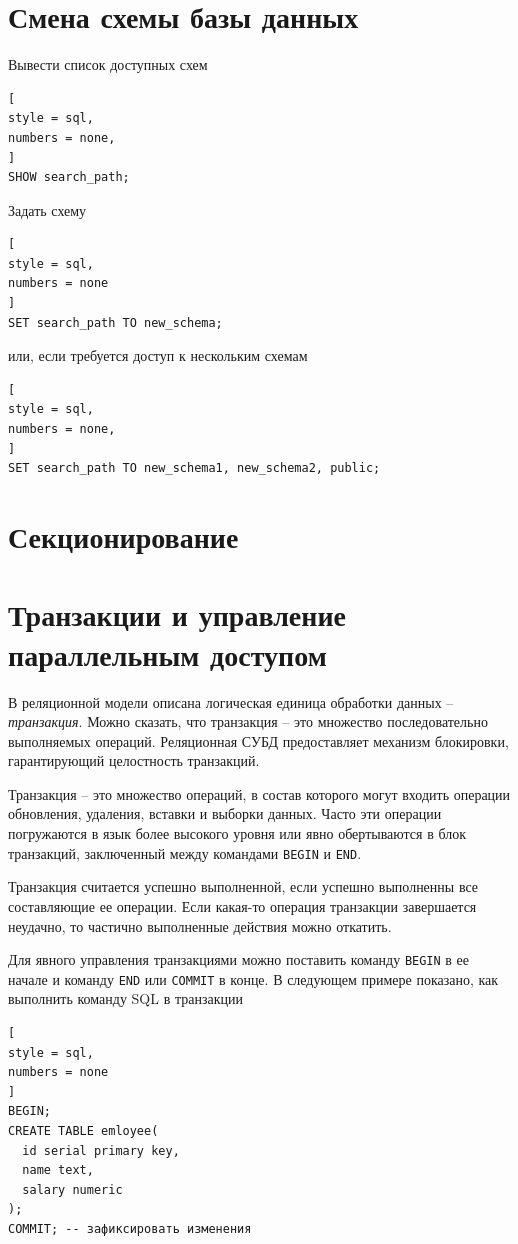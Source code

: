 \documentclass[%
	11pt,
	a4paper,
	utf8,
		]{article}
\begin{document}
\section{Смена схемы базы данных}

Вывести список доступных схем

\begin{lstlisting}[
style = sql,
numbers = none,
]
SHOW search_path;
\end{lstlisting}

Задать схему 

\begin{lstlisting}[
style = sql,
numbers = none
]
SET search_path TO new_schema;
\end{lstlisting}
или, если требуется доступ к нескольким схемам
\begin{lstlisting}[
style = sql,
numbers = none,
]
SET search_path TO new_schema1, new_schema2, public;
\end{lstlisting}

\section{Секционирование}

\section{Транзакции и управление параллельным доступом}

В реляционной модели описана логическая единица обработки данных -- \emph{транзакция}. Можно сказать, что транзакция -- это множество последовательно выполняемых операций. Реляционная СУБД предоставляет механизм блокировки, гарантирующий целостность транзакций.

Транзакция -- это множество операций, в состав которого могут входить операции обновления, удаления, вставки и выборки данных. Часто эти операции погружаются в язык более высокого уровня или явно обертываются в блок транзакций, заключенный между командами \texttt{BEGIN} и \texttt{END}.

Транзакция считается успешно выполненной, если успешно выполненны все составляющие ее операции. Если какая-то операция транзакции завершается неудачно, то частично выполненные действия можно откатить.

Для явного управления транзакциями можно поставить команду \texttt{BEGIN} в ее начале и команду \texttt{END} или \texttt{COMMIT} в конце. В следующем примере показано, как выполнить команду SQL в транзакции
\begin{lstlisting}[
style = sql,
numbers = none
]
BEGIN;
CREATE TABLE emloyee(
  id serial primary key,
  name text,
  salary numeric
);
COMMIT; -- зафиксировать изменения
\end{lstlisting}
\end{document}
